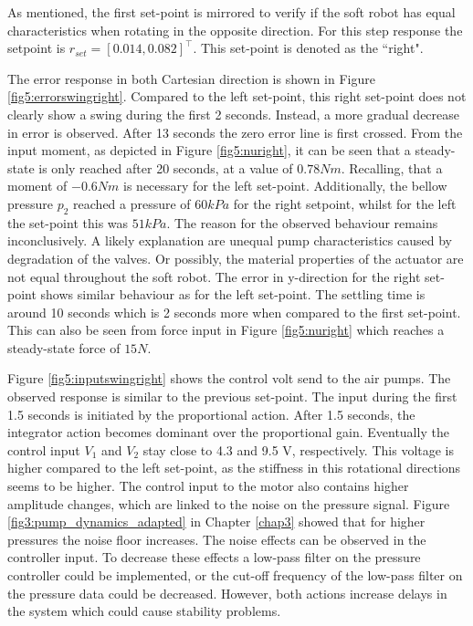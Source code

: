 As mentioned, the first set-point is mirrored to verify if the soft robot has equal characteristics when rotating in the opposite direction. For this step response the setpoint is $r_{set} = [0.014,0.082]^\top$. This set-point is denoted as the ``right".


The error response in both Cartesian direction is shown in Figure \ref{fig5:errorswingright}. Compared to the left set-point, this right set-point does not clearly show a swing during the first 2 seconds. Instead, a more gradual decrease in error is observed. After 13 seconds the zero error line is first crossed. From the input moment, as depicted in Figure \ref{fig5:nuright}, it can be seen that a steady-state is only reached after 20 seconds, at a value of $0.78 Nm$. Recalling, that a moment of $-0.6 Nm$ is necessary for the left set-point. Additionally, the bellow pressure $p_2$ reached a pressure of $60 kPa$ for the right setpoint, whilst for the left the set-point this was $51 kPa$. The reason for the observed behaviour remains inconclusively. A likely explanation are unequal pump characteristics caused by degradation of the valves. Or possibly, the material properties of the actuator are not equal throughout the soft robot. The error in y-direction for the right set-point shows similar behaviour as for the left set-point. The settling time is around 10 seconds which is 2 seconds more when compared to the first set-point. This can also be seen from force input in Figure \ref{fig5:nuright} which reaches a steady-state force of $15 N$.

Figure \ref{fig5:inputswingright} shows the control volt send to the air pumps. The observed response is similar to the previous set-point. The input during the first 1.5 seconds is initiated by the proportional action. After 1.5 seconds, the integrator action becomes dominant over the proportional gain. Eventually the control input $V_1$ and $V_2$ stay close to 4.3 and 9.5 V, respectively. This voltage is higher compared to the left set-point, as the stiffness in this rotational directions seems to be higher. The control input to the motor also contains higher amplitude changes, which are linked to the noise on the pressure signal. Figure \ref{fig3:pump_dynamics_adapted} in Chapter \ref{chap3} showed that for higher pressures the noise floor increases. The noise effects can be observed in the controller input. To decrease these effects a low-pass filter on the pressure controller could be implemented, or the cut-off frequency of the low-pass filter on the pressure data could be decreased. However, both actions increase delays in the system which could cause stability problems.

